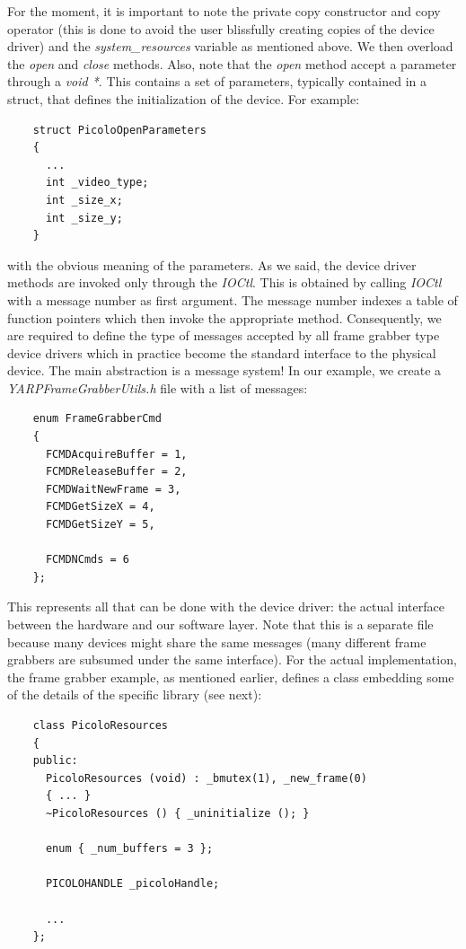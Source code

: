 For the moment, it is important to note the private copy constructor
and copy operator (this is done to avoid the user blissfully creating
copies of the device driver) and the {\em system\_resources} variable
as mentioned above. We then overload the {\em open} and {\em close}
methods. Also, note that the {\em open} method accept a parameter
through a {\em void *}. This contains a set of parameters, typically
contained in a struct, that defines the initialization of the
device. For example:

\begin{verbatim}
    struct PicoloOpenParameters
    { 
      ...
      int _video_type;
      int _size_x;
      int _size_y;
    }
\end{verbatim}

\noindent with the obvious meaning of the parameters. As we said, the
device driver methods are invoked only through the {\em IOCtl}. This
is obtained by calling {\em IOCtl} with a message number as first
argument. The message number indexes a table of function pointers
which then invoke the appropriate method. Consequently, we are
required to define the type of messages accepted by all frame grabber
type device drivers which in practice become the standard interface to
the physical device. The main abstraction is a message system! In our
example, we create a {\em YARPFrameGrabberUtils.h} file with a list of
messages:

\begin{verbatim}
    enum FrameGrabberCmd
    {
      FCMDAcquireBuffer = 1,
      FCMDReleaseBuffer = 2,
      FCMDWaitNewFrame = 3,
      FCMDGetSizeX = 4,
      FCMDGetSizeY = 5,

      FCMDNCmds = 6
    };
\end{verbatim}

This represents all that can be done with the device driver: the
actual interface between the hardware and our software layer. Note that
this is a separate file because many devices might share the same
messages (many different frame grabbers are subsumed under the same
interface). For the actual implementation, the frame grabber example,
as mentioned earlier, defines a class embedding some of the details of
the specific library (see next):

\begin{verbatim}
    class PicoloResources
    {
    public:
      PicoloResources (void) : _bmutex(1), _new_frame(0)
      { ... }
      ~PicoloResources () { _uninitialize (); }

      enum { _num_buffers = 3 };

      PICOLOHANDLE _picoloHandle;	

      ...
    };
\end{verbatim}

